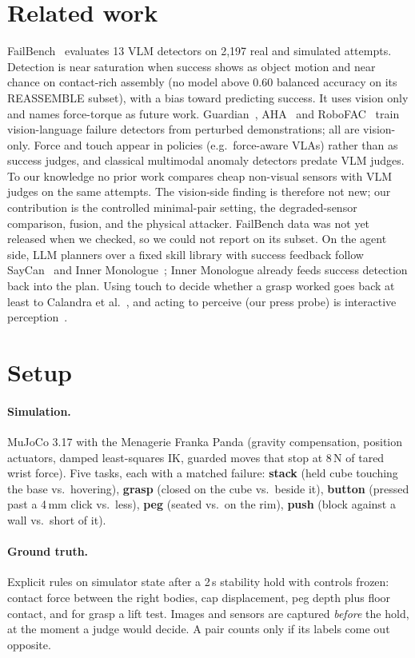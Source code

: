 \documentclass[10pt,twocolumn]{article}
\begin{document}
\section{Related work}
FailBench~\cite{failbench} evaluates 13 VLM detectors on 2{,}197 real and simulated attempts. Detection is near saturation when success shows as object motion and near chance on contact-rich assembly (no model above 0.60 balanced accuracy on its REASSEMBLE subset), with a bias toward predicting success. It uses vision only and names force-torque as future work. Guardian~\cite{guardian}, AHA~\cite{aha} and RoboFAC~\cite{robofac} train vision-language failure detectors from perturbed demonstrations; all are vision-only. Force and touch appear in policies (e.g.\ force-aware VLAs) rather than as success judges, and classical multimodal anomaly detectors predate VLM judges. To our knowledge no prior work compares cheap non-visual sensors with VLM judges on the same attempts. The vision-side finding is therefore not new; our contribution is the controlled minimal-pair setting, the degraded-sensor comparison, fusion, and the physical attacker. FailBench data was not yet released when we checked, so we could not report on its subset. On the agent side, LLM planners over a fixed skill library with success feedback follow SayCan~\cite{saycan} and Inner Monologue~\cite{innermono}; Inner Monologue already feeds success detection back into the plan. Using touch to decide whether a grasp worked goes back at least to Calandra et al.~\cite{feeling}, and acting to perceive (our press probe) is interactive perception~\cite{interactive}.

\section{Setup}
\paragraph{Simulation.} MuJoCo 3.17 with the Menagerie Franka Panda (gravity compensation, position actuators, damped least-squares IK, guarded moves that stop at 8\,N of tared wrist force). Five tasks, each with a matched failure: \textbf{stack} (held cube touching the base vs.\ hovering), \textbf{grasp} (closed on the cube vs.\ beside it), \textbf{button} (pressed past a 4\,mm click vs.\ less), \textbf{peg} (seated vs.\ on the rim), \textbf{push} (block against a wall vs.\ short of it).
\paragraph{Ground truth.} Explicit rules on simulator state after a 2\,s stability hold with controls frozen: contact force between the right bodies, cap displacement, peg depth plus floor contact, and for grasp a lift test. Images and sensors are captured \emph{before} the hold, at the moment a judge would decide. A pair counts only if its labels come out opposite.
\end{document}
